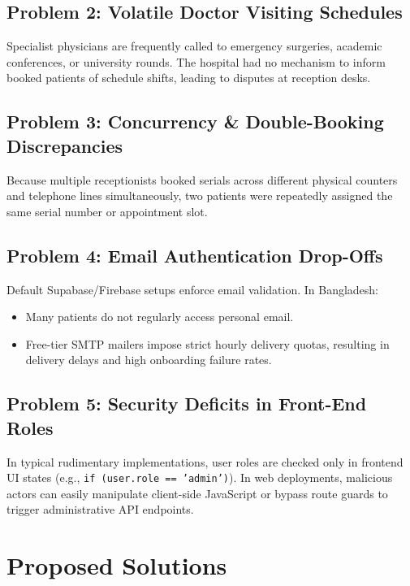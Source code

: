 \documentclass[11pt,a4paper,oneside]{report}
\begin{document}
\section{Problem 2: Volatile Doctor Visiting Schedules}
Specialist physicians are frequently called to emergency surgeries, academic conferences, or university rounds. The hospital had no mechanism to inform booked patients of schedule shifts, leading to disputes at reception desks.

\section{Problem 3: Concurrency \& Double-Booking Discrepancies}
Because multiple receptionists booked serials across different physical counters and telephone lines simultaneously, two patients were repeatedly assigned the same serial number or appointment slot.

\section{Problem 4: Email Authentication Drop-Offs}
Default Supabase/Firebase setups enforce email validation. In Bangladesh:
\begin{itemize}
    \item Many patients do not regularly access personal email.
    \item Free-tier SMTP mailers impose strict hourly delivery quotas, resulting in delivery delays and high onboarding failure rates.
\end{itemize}

\section{Problem 5: Security Deficits in Front-End Roles}
In typical rudimentary implementations, user roles are checked only in frontend UI states (e.g., \texttt{if (user.role == 'admin')}). In web deployments, malicious actors can easily manipulate client-side JavaScript or bypass route guards to trigger administrative API endpoints.

\chapter{Proposed Solutions}
\end{document}
